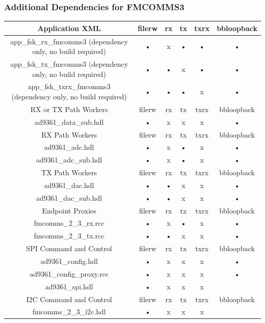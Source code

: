 \subsubsection{Additional Dependencies for FMCOMMS3}
	\begin{tabular}{|c|c|c|c|c|c|}
	\hline
	\rowcolor{blue}
	Application XML & filerw & rx & tx & txrx & bbloopback \\
	\hline
	app\_fsk\_rx\_fmcomms3 (dependency only, no build required) & • & x & • & • & • \\
	\hline
	app\_fsk\_tx\_fmcomms3 (dependency only, no build required) & • & • & x & • & • \\
	\hline
	app\_fsk\_txrx\_fmcomms3 (dependency only, no build required) & • & •  & • & x & • \\
	\hline
	\rowcolor{blue}
	RX or TX Path Workers & filerw & rx & tx & txrx & bbloopback \\
	\hline
	ad9361\_data\_sub.hdl & • & x & x & x & • \\
	\rowcolor{blue}
	RX Path Workers & filerw & rx & tx & txrx & bbloopback \\
	\hline
	ad9361\_adc.hdl & • & x & • & x & • \\
	\hline
	ad9361\_adc\_sub.hdl & • & x & • & x & • \\
	\hline
	\rowcolor{blue}
	TX Path Workers & filerw & rx & tx & txrx & bbloopback \\
	\hline
	ad9361\_dac.hdl & • & • & x & x & • \\
	\hline
	ad9361\_dac\_sub.hdl & • & • & x & x & • \\
	\rowcolor{blue}
	Endpoint Proxies & filerw & rx & tx & txrx & bbloopback \\
	\hline
	fmcomms\_2\_3\_rx.rcc & • & x & • & x & • \\
	\hline
	fmcomms\_2\_3\_tx.rcc & • & • & x & x & • \\
	\hline
	\rowcolor{blue}
	SPI Command and Control & filerw & rx & tx & txrx & bbloopback \\
	\hline
	ad9361\_config.hdl & • & x & x & x & • \\
	\hline
	ad9361\_config\_proxy.rcc & • & x & x & x & •  \\
	\hline
	ad9361\_spi.hdl & • & x & x & x &   \\
	\hline
	\rowcolor{blue}
	I2C Command and Control & filerw & rx & tx & txrx & bbloopback \\
	\hline
	fmcomms\_2\_3\_i2c.hdl & • & x & x & x &   \\
	\hline
	\end{tabular}





